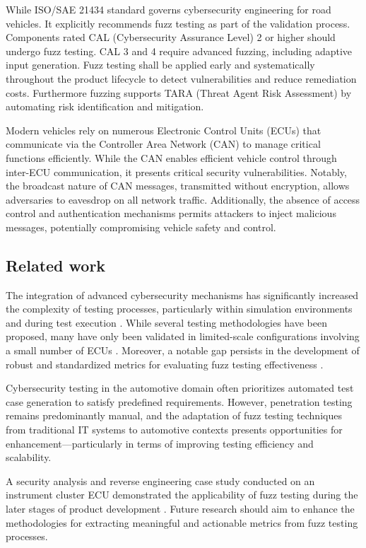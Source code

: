 \documentclass[a4paper, fleqn]{template/cas-dc}
\begin{document}
	While ISO/SAE 21434 standard governs cybersecurity engineering for road vehicles. It explicitly recommends fuzz testing as part of the validation process. Components rated CAL (Cybersecurity Assurance Level) 2 or higher should undergo fuzz testing. CAL 3 and 4 require advanced fuzzing, including adaptive input generation. Fuzz testing shall be applied early and systematically throughout the product lifecycle to detect vulnerabilities and reduce remediation costs. Furthermore fuzzing supports TARA (Threat Agent Risk Assessment) by automating risk identification and mitigation.
	
	Modern vehicles rely on numerous Electronic Control Units (ECUs) that communicate via the Controller Area Network (CAN) to manage critical functions efficiently. While the CAN enables efficient vehicle control through inter-ECU communication, it presents critical security vulnerabilities. Notably, the broadcast nature of CAN messages, transmitted without encryption, allows adversaries to eavesdrop on all network traffic. Additionally, the absence of access control and authentication mechanisms permits attackers to inject malicious messages, potentially compromising vehicle safety and control.
		
	\subsection{Related work}
	
	The integration of advanced cybersecurity mechanisms has significantly increased the complexity of testing processes, particularly within simulation environments and during test execution  \cite{marksteiner2021using}. While several testing methodologies have been proposed, many have only been validated in limited-scale configurations involving a small number of ECUs \cite{oruganti2019hardware}. Moreover, a notable gap persists in the development of robust and standardized metrics for evaluating fuzz testing effectiveness \cite{fowler2019method}.
	
	Cybersecurity testing in the automotive domain often prioritizes automated test case generation to satisfy predefined requirements. However, penetration testing remains predominantly manual, and the adaptation of fuzz testing techniques from traditional IT systems to automotive contexts presents opportunities for enhancement—particularly in terms of improving testing efficiency and scalability.
	
	A security analysis and reverse engineering case study conducted on an instrument cluster ECU demonstrated the applicability of fuzz testing during the later stages of product development \cite{anistoroaei2022security}. Future research should aim to enhance the methodologies for extracting meaningful and actionable metrics from fuzz testing processes.
	
\end{document}

